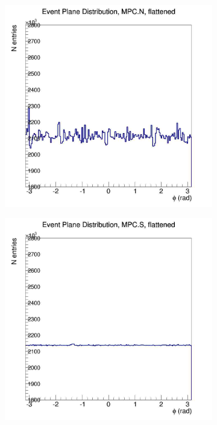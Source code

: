 \begin{figure}[htbp!]
\begin{subfigure}[p]{0.4\textwidth}
    \end{subfigure}
    \begin{subfigure}[p]{0.4\textwidth}
    \includegraphics[width=1\textwidth]{EPflattening/flatmpcn.jpg}
    \end{subfigure}
    \begin{subfigure}[p]{0.4\textwidth}
    \includegraphics[width=1\textwidth]{EPflattening/flatmpcs.jpg}

\end{subfigure}
\end{figure}
